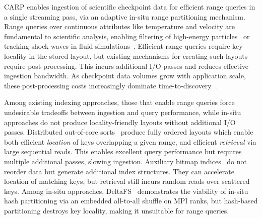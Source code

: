 

CARP enables ingestion of scientific checkpoint data for efficient range queries in a single
streaming pass, via an adaptive in-situ range partitioning mechanism.
Range queries over continuous attributes like temperature and velocity are fundamental to
scientific analysis, enabling filtering of high-energy particles~\cite{Byna2012} or tracking
shock waves in fluid simulations~\cite{Grete2023:Parthenon, Zhang2021:AMReX, Barke2024:Phoebus}.
Efficient range queries require key locality in the stored layout, but existing mechanisms
for creating such layouts require post-processing.
This incurs additional I/O passes and reduces
effective ingestion bandwidth.
As checkpoint data volumes grow with application scale, these post-processing costs increasingly
dominate time-to-discovery~\cite{Bauer2016:SituMethodsInfrastructures}.

Among existing indexing approaches, those that enable range queries force undesirable tradeoffs
between
ingestion and query performance, while in-situ approaches do not produce locality-friendly layouts
without additional I/O passes.
Distributed out-of-core sorts~\cite{Rasmu2011:TritonSort} produce fully ordered layouts which
enable both efficient \emph{location} of keys overlapping a given range, and efficient
\emph{retrieval} via large sequential reads.
This enables excellent query performance but requires multiple additional passes, slowing
ingestion.
Auxiliary bitmap indices~\cite{Chou2011:FastQuery} do not reorder data but generate additional
index structures.
They can accelerate location of matching keys, but
retrieval still
incurs random reads over scattered keys.
Among in-situ approaches, DeltaFS~\cite{Zheng2018:DeltaFS} demonstrates the viability of in-situ
hash partitioning
via an embedded all-to-all shuffle on MPI ranks, but hash-based
partitioning destroys key locality, making it unsuitable for range queries.

